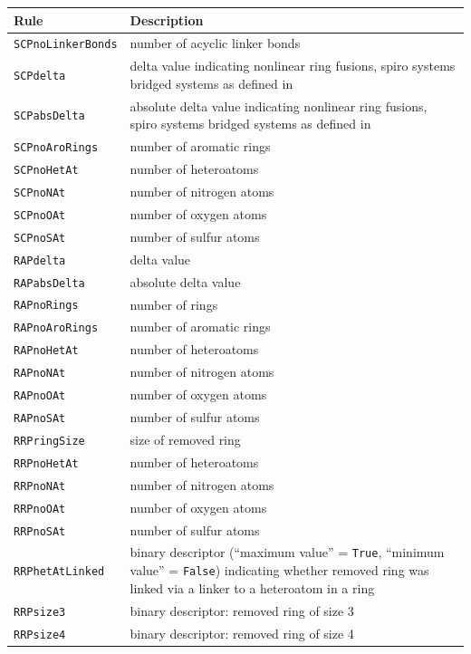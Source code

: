 \begin{longtable}{lp{}}
\textbf{Rule}			& \textbf{Description} \\
\toprule
\texttt{SCPnoLinkerBonds}	& number of acyclic linker bonds \\
\texttt{SCPdelta}		& delta value indicating nonlinear ring fusions, spiro systems bridged systems as defined in \cite{schuffenhauer_et_al2007} \\
\texttt{SCPabsDelta}		& absolute delta value indicating nonlinear ring fusions, spiro systems bridged systems as defined in \cite{schuffenhauer_et_al2007} \\
\texttt{SCPnoAroRings}		& number of aromatic rings \\
\texttt{SCPnoHetAt}		& number of heteroatoms \\
\texttt{SCPnoNAt}		& number of nitrogen atoms \\
\texttt{SCPnoOAt}		& number of oxygen atoms \\
\texttt{SCPnoSAt}		& number of sulfur atoms \\
\midrule
\texttt{RAPdelta}		& delta value \\
\texttt{RAPabsDelta}		& absolute delta value \\
\texttt{RAPnoRings}		& number of rings \\
\texttt{RAPnoAroRings}		& number of aromatic rings \\
\texttt{RAPnoHetAt}		& number of heteroatoms \\
\texttt{RAPnoNAt}		& number of nitrogen atoms \\
\texttt{RAPnoOAt}		& number of oxygen atoms \\
\texttt{RAPnoSAt}		& number of sulfur atoms \\
\midrule
\texttt{RRPringSize}		& size of removed ring \\
\texttt{RRPnoHetAt}		& number of heteroatoms \\
\texttt{RRPnoNAt}		& number of nitrogen atoms \\
\texttt{RRPnoOAt}		& number of oxygen atoms \\
\texttt{RRPnoSAt}		& number of sulfur atoms \\
\texttt{RRPhetAtLinked}		& binary descriptor (``maximum value'' = \texttt{True}, ``minimum value'' = \texttt{False}) indicating whether removed ring was linked via a linker to a heteroatom in a ring \\
\texttt{RRPsize3}		& binary descriptor: removed ring of size 3 \\
\texttt{RRPsize4}		& binary descriptor: removed ring of size 4 \\

\end{longtable}
